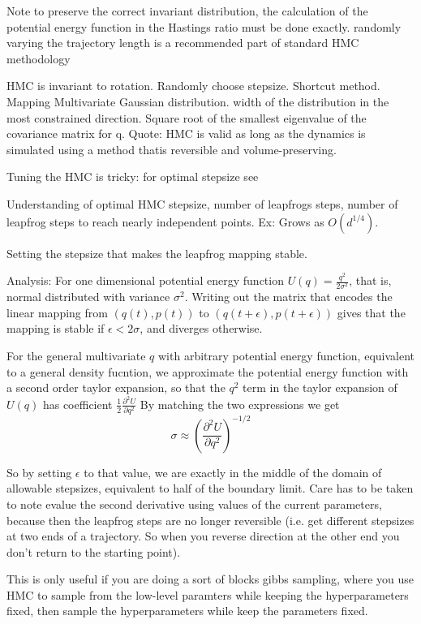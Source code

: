 \documentclass{book}
\begin{document}
\begin{enumerate}
Note to preserve the correct invariant distribution, the calculation of the potential energy function in the Hastings ratio must be done exactly. 
randomly varying the trajectory length is a recommended part of standard HMC methodology

HMC is invariant to rotation.
Randomly choose stepsize. 
Shortcut method.
Mapping Multivariate Gaussian distribution. width of the distribution in the most constrained direction. Square root of the smallest eigenvalue of the covariance matrix for q.
Quote: HMC is valid as long as the dynamics is simulated using a method thatis reversible and volume-preserving. 

Tuning the HMC is tricky: for optimal stepsize see \cite{beskos2013optimal}

Understanding of optimal HMC stepsize, number of leapfrogs steps, number of leapfrog steps to reach nearly independent points.
Ex: Grows as $O(d^{1/4})$.

Setting the stepsize that makes the leapfrog mapping stable.

Analysis: For one dimensional potential energy function $U(q) = \frac{q^2}{2\sigma^2}$,
that is, normal distributed with variance $\sigma^2$. Writing out the matrix that encodes the linear mapping from $(q(t),p(t))$ to $(q(t+\epsilon),p(t+\epsilon))$ gives that the mapping is stable if $\epsilon < 2 \sigma$, and diverges otherwise. 

For the general multivariate $q$ with arbitrary potential energy function, equivalent to a general density fucntion, we approximate the potential energy function with a second order taylor expansion, so that the $q^2$ term in the taylor expansion of $U(q)$ has coefficient $\frac{1}{2} \frac{\partial^2 U}{\partial q^2}$  
By matching the two expressions we get 
\[ \sigma \approx ( \frac{\partial^2 U}{\partial q^2})^{-1/2} \]

So by setting $\epsilon$ to that value, we are exactly in the middle of the domain of allowable stepsizes, equivalent to half of the boundary limit.
Care has to be taken to note evalue the second derivative using values of the current parameters, because then the leapfrog steps are no longer reversible (i.e. get different stepsizes at two ends of a trajectory. So when you reverse direction at the other end you don't return to  the starting point). 

This is only useful if you are doing a sort of blocks gibbs sampling, where you use HMC to sample from the low-level paramters while keeping the hyperparameters fixed, then sample the hyperparameters while keep the parameters fixed. 


\end{enumerate}
\end{document}
